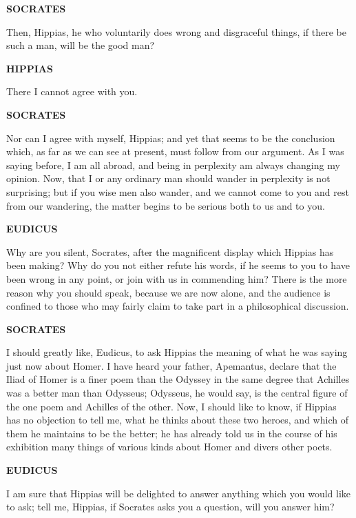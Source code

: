 \documentclass[11pt,letter]{article}
\begin{document}
\par \textbf{SOCRATES}
\par   Then, Hippias, he who voluntarily does wrong and disgraceful things, if there be such a man, will be the good man?

\par \textbf{HIPPIAS}
\par   There I cannot agree with you.

\par \textbf{SOCRATES}
\par   Nor can I agree with myself, Hippias; and yet that seems to be the conclusion which, as far as we can see at present, must follow from our argument. As I was saying before, I am all abroad, and being in perplexity am always changing my opinion. Now, that I or any ordinary man should wander in perplexity is not surprising; but if you wise men also wander, and we cannot come to you and rest from our wandering, the matter begins to be serious both to us and to you.

\par \textbf{EUDICUS}
\par   Why are you silent, Socrates, after the magnificent display which Hippias has been making? Why do you not either refute his words, if he seems to you to have been wrong in any point, or join with us in commending him? There is the more reason why you should speak, because we are now alone, and the audience is confined to those who may fairly claim to take part in a philosophical discussion.

\par \textbf{SOCRATES}
\par   I should greatly like, Eudicus, to ask Hippias the meaning of what he was saying just now about Homer. I have heard your father, Apemantus, declare that the Iliad of Homer is a finer poem than the Odyssey in the same degree that Achilles was a better man than Odysseus; Odysseus, he would say, is the central figure of the one poem and Achilles of the other. Now, I should like to know, if Hippias has no objection to tell me, what he thinks about these two heroes, and which of them he maintains to be the better; he has already told us in the course of his exhibition many things of various kinds about Homer and divers other poets.

\par \textbf{EUDICUS}
\par   I am sure that Hippias will be delighted to answer anything which you would like to ask; tell me, Hippias, if Socrates asks you a question, will you answer him?
\end{document}
